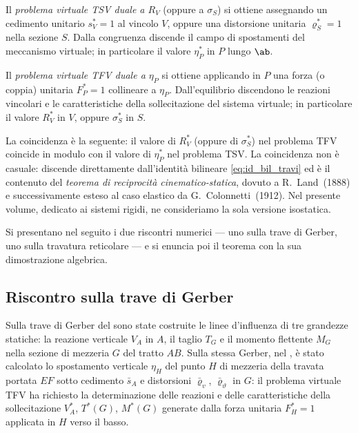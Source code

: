 Il \emph{problema virtuale TSV duale a $R_V$} (oppure a 
$\sigma_S$) si ottiene assegnando un cedimento unitario 
$s^{*}_V=1$ al vincolo $V$, oppure una distorsione unitaria 
$\varrho^{*}_S=1$ nella sezione $S$. Dalla congruenza discende 
il campo di spostamenti del meccanismo virtuale; in particolare 
il valore $\eta^{*}_P$ in $P$ lungo $\ab$.

Il \emph{problema virtuale TFV duale a $\eta_P$} si ottiene 
applicando in $P$ una forza (o coppia) unitaria $F^{*}_P=1$ 
collineare a $\eta_P$. Dall'equilibrio discendono le reazioni 
vincolari e le caratteristiche della sollecitazione del sistema 
virtuale; in particolare il valore $R^{*}_V$ in $V$, oppure 
$\sigma^{*}_S$ in $S$.

La coincidenza è la seguente: il valore di $R^{*}_V$ (oppure di 
$\sigma^{*}_S$) nel problema TFV coincide in modulo con il valore 
di $\eta^{*}_P$ nel problema TSV. La coincidenza non è casuale: 
discende direttamente dall'identità bilineare 
\eqref{eq:id_bil_travi} ed è il contenuto del \emph{teorema di 
	reciprocità cinematico-statica}, dovuto a R.~Land~(1888) e 
successivamente esteso al caso elastico da G.~Colonnetti~(1912). 
Nel presente volume, dedicato ai sistemi rigidi, ne consideriamo 
la sola versione isostatica.

Si presentano nel seguito i due riscontri numerici --- uno sulla 
trave di Gerber, uno sulla travatura reticolare --- e si enuncia 
poi il teorema con la sua dimostrazione algebrica.

\subsection*{Riscontro sulla trave di Gerber}

Sulla trave di Gerber del  sono state 
costruite le linee d'influenza di tre grandezze statiche: la 
reazione verticale $V_A$ in $A$, il taglio $T_G$ e il momento 
flettente $M_G$ nella sezione di mezzeria $G$ del tratto $AB$. 
Sulla stessa Gerber, nel , è stato 
calcolato lo spostamento verticale $\eta_H$ del punto $H$ di 
mezzeria della travata portata $EF$ sotto cedimento $\bar s_A$ 
e distorsioni $\bar\varrho_v$, $\bar\varrho_\vartheta$ in $G$: 
il problema virtuale TFV ha richiesto la determinazione delle 
reazioni e delle caratteristiche della sollecitazione $V_A^{*}$, 
$T^{*}(G)$, $M^{*}(G)$ generate dalla forza unitaria $F^{*}_H=1$ 
applicata in $H$ verso il basso.

